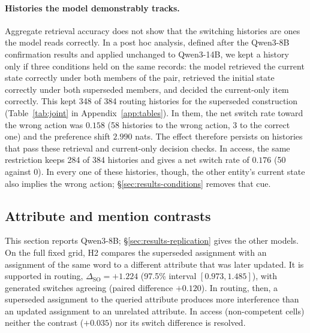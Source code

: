 \paragraph{Histories the model demonstrably tracks.} Aggregate retrieval accuracy does not show that the
switching histories are ones the model reads correctly. In a post hoc analysis, defined after the
Qwen3-8B confirmation results and applied unchanged to Qwen3-14B, we kept a history only if three
conditions held on the same records: the model retrieved the current state correctly under both members
of the pair, retrieved the initial state correctly under both superseded members, and decided the
current-only item correctly. This kept 348 of 384 routing histories for the superseded construction
(Table~\ref{tab:joint} in Appendix~\ref{app:tables}). In them, the net switch rate toward the wrong action was $0.158$
(58 histories to the wrong action, 3 to the correct one) and the preference shift $2.990$ nats. The effect therefore persists on histories that pass these retrieval and current-only decision checks. In
access, the same restriction keeps 284 of 384 histories and gives a net switch rate of $0.176$ (50 against 0). In every one of these histories, though, the other entity's current state
also implies the wrong action; \S\ref{sec:results-conditions} removes that cue.



\subsection{Attribute and mention contrasts}
\label{sec:results-h2}



This section reports Qwen3-8B; \S\ref{sec:results-replication} gives the other models. On the full fixed grid, H2 compares the
superseded assignment with an assignment of the same word to a different attribute that was later updated. It is supported in routing, $\Delta_{\mathrm{SO}} = +1.224$ (97.5\% interval $[0.973, 1.485]$), with
generated switches agreeing (paired difference $+0.120$). In routing, then, a superseded
assignment to the queried attribute produces more interference than an updated assignment to an
unrelated attribute. In access
(non-competent cells) neither the contrast ($+0.035$) nor its switch difference is resolved.

